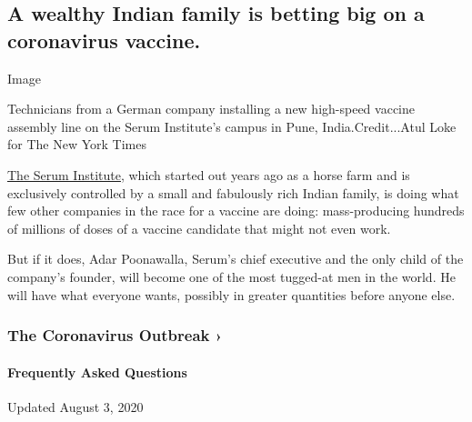 \hypertarget{a-wealthy-indian-family-is-betting-big-on-a-coronavirus-vaccine}{%
\subsection{A wealthy Indian family is betting big on a coronavirus
vaccine.}\label{a-wealthy-indian-family-is-betting-big-on-a-coronavirus-vaccine}}

Image

Technicians from a German company installing a new high-speed vaccine
assembly line on the Serum Institute's campus in Pune,
India.Credit...Atul Loke for The New York Times

\href{https://www.seruminstitute.com/index.php}{The Serum Institute},
which started out years ago as a horse farm and is exclusively
controlled by a small and fabulously rich Indian family, is doing what
few other companies in the race for a vaccine are doing: mass-producing
hundreds of millions of doses of a vaccine candidate that might not even
work.

But if it does, Adar Poonawalla, Serum's chief executive and the only
child of the company's founder, will become one of the most tugged-at
men in the world. He will have what everyone wants, possibly in greater
quantities before anyone else.

\href{https://www.nytimes.com/news-event/coronavirus?action=click\&pgtype=Article\&state=default\&region=MAIN_CONTENT_3\&context=storylines_faq}{}

\hypertarget{the-coronavirus-outbreak-}{%
\subsubsection{The Coronavirus Outbreak
›}\label{the-coronavirus-outbreak-}}

\hypertarget{frequently-asked-questions}{%
\paragraph{Frequently Asked
Questions}\label{frequently-asked-questions}}

Updated August 3, 2020

